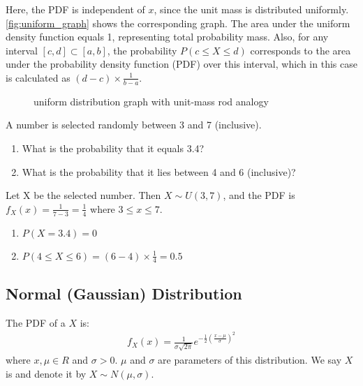 Here, the PDF is independent of \( x \), since the unit mass is distributed uniformly.
\autoref{fig:uniform_graph} shows the corresponding graph.
The area under the uniform density function equals 1, representing total probability mass.
Also, for any interval \( [c, d] \subset [a, b] \),
the probability \( P(c \leq X \leq d) \) corresponds to the area under the probability density function (PDF) over this interval,
which in this case is calculated as \( (d - c) \times \frac{1}{b - a} \).
\begin{figure}[t]
\begin{center}
\end{center}
\caption{uniform distribution graph with unit-mass rod analogy}
\label{fig:uniform_graph}
\end{figure}

\begin{exmp}
    A number is selected randomly between 3 and 7 (inclusive).
    \begin{enumerate}
        \item What is the probability that it equals 3.4?
        \item What is the probability that it lies between 4 and 6 (inclusive)?
    \end{enumerate}
\end{exmp}
\begin{solution}
    Let X be the selected number.
    Then \( X \sim U(3, 7) \),
    and the PDF is \( f_{X}(x) = \frac{1}{7 - 3} = \frac{1}{4} \) where \( 3 \leq x \leq 7 \).
    \begin{enumerate}
        \item \( P(X = 3.4) = 0 \)
        \item \( P(4 \leq X \leq 6) = (6 - 4) \times \frac{1}{4} = 0.5 \)
    \end{enumerate}
\end{solution}

\subsection{Normal (Gaussian) Distribution}

The PDF of a  \( X \) is:
\begin{gather*}
    f_{X}(x) = \frac{1}{\sigma\sqrt{2\pi}}e^{-\frac{1}{2}(\frac{x - \mu}{\sigma})^2}
\end{gather*}
where \( x, \mu \in R \) and \( \sigma > 0 \).
\( \mu \) and \( \sigma \) are parameters of this distribution.
We say \( X \) is  and denote it by \( X \sim N(\mu, \sigma) \).


